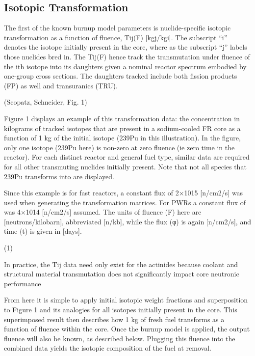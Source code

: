 \subsection{Isotopic Transformation}
\label{1g_sec:iso_transform}
The first of the known burnup model parameters is nuclide-specific isotopic transformation as a function of fluence, Tij(F) [kgj/kgi].  The subscript “i” denotes the isotope initially present in the core, where as the subscript “j” labels those nuclides bred in.  The Tij(F) hence track the transmutation under fluence of the ith isotope into its daughters given a nominal reactor spectrum embodied by one-group cross sections.  The daughters tracked include both fission products (FP) as well and transuranics (TRU).

(Scopatz, Schneider, Fig. 1)

Figure 1 displays an example of this transformation data: the concentration in kilograms of tracked isotopes that are present in a sodium-cooled FR core as a function of 1 kg of the initial isotope (239Pu in this illustration).  In the figure, only one isotope (239Pu here) is non-zero at zero fluence (ie zero time in the reactor).  For each distinct reactor and general fuel type, similar data are required for all other transmuting nuclides initially present.   Note that not all species that 239Pu transforms into are displayed. 

Since this example is for fast reactors, a constant flux of 2×1015 [n/cm2/s] was used when generating the transformation matrices.  For PWRs a constant flux of was 4×1014 [n/cm2/s] assumed.  The units of fluence (F) here are [neutrons/kilobarn], abbreviated [n/kb], while the flux (φ) is again [n/cm2/s], and time (t) is given in [days].

                (1) 

In practice, the Tij data need only exist for the actinides because coolant and structural material transmutation does not significantly impact core neutronic performance  

From here it is simple to apply initial isotopic weight fractions and superposition to Figure 1 and its analogies for all isotopes initially present in the core.  This superimposed result then describes how 1 kg of fresh fuel transforms as a function of fluence within the core. Once the burnup model is applied, the output fluence will also be known, as described below.  Plugging this fluence into the combined data yields the isotopic composition of the fuel at removal. 




